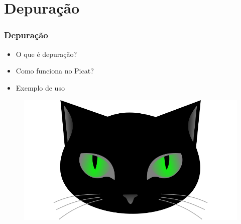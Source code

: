 \section{Depuração}
\begin{frame}[fragile]
\frametitle{Depuração}
\begin{minipage}{0.47\textwidth}
    \begin{itemize}
        \item O que é depuração?
        \item Como funciona no Picat? 
        \item Exemplo de uso
    \end{itemize}
\end{minipage}
\begin{minipage}{0.5\textwidth}
\begin{figure}[ht!]
\begin{center}
\includegraphics[width=1.2\textwidth, height=0.40\textheight]{figures/logo_picat_alex.jpg}
\end{center}
\end{figure}
\end{minipage}
\end{frame}
